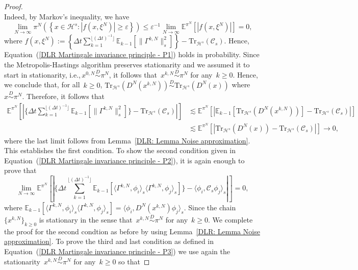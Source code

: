 \begin{proof}
\begin{equation*}
  \end{equation*}
  Indeed, by Markov's inequality, we have
  \begin{equation*}
    \lim_{N \to \infty} \pi^N \left( \left\{ x \in \mathcal{H}^s : \left| f(x, \xi^N)  \right| \geq \varepsilon \right\} \right) \leq \varepsilon^{-1} \lim_{N \to \infty} \mathbb{E}^{\pi^N} \left[ \left| f(x, \xi^N) \right| \right] = 0,
  \end{equation*}
  where $f(x, \xi^N) := \left\{ \Delta t \sum_{k=1}^{\lfloor (\Delta t)^{-1} \rfloor} \mathbb{E}_{k-1}[\| \Gamma^{k,N} \|_s^2]  \right\} - \text{Tr}_{\mathcal{H}^s}(\mathcal{C}_s)$. Hence, Equation~(\ref{DLR Martingale invariance principle - P1}) holds in probability. Since the Metropolis-Hastings algorithm preserves stationarity and we assumed it to start in stationarity, i.e.,\,$x^{0,N} \stackrel{D}{\sim} \pi^N$, it follows that~$x^{k,N}\stackrel{D}{\sim} \pi^N$ for any~$k \geq 0$. Hence, we conclude that, for all~$k \geq 0$, $\text{Tr}_{\mathcal{H}^s} (D^N(x^{k,N})) \stackrel{D}{\sim} \text{Tr}_{\mathcal{H}^s} (D^N(x))$ where $x \stackrel{D}{\sim} \pi^N$. Therefore, it follows that
  \begin{align*}
    \mathbb{E}^{\pi^N} [ | \{ \Delta t \sum_{k=1}^{\lfloor (\Delta t)^{-1} \rfloor} \mathbb{E}_{k-1}[\| \Gamma^{k,N} \|_s^2]  \} - \text{Tr}_{\mathcal{H}^s}(\mathcal{C}_s) | ] & \lesssim \mathbb{E}^{\pi^N} \left[ \left|  \mathbb{E}_{k-1}[\text{Tr}_{\mathcal{H}^s} (D^N(x^{k,N}))] - \text{Tr}_{\mathcal{H}^s}(\mathcal{C}_s) \right| \right] \\
   &  \lesssim \mathbb{E}^{\pi^N} \left[ \left| \text{Tr}_{\mathcal{H}^s} (D^N(x)) - \text{Tr}_{\mathcal{H}^s}(\mathcal{C}_s) \right| \right]  \to 0,
  \end{align*}
  where the last limit follows from Lemma~\ref{DLR: Lemma Noise approximation}. This establishes the first condition. To show the second condition given in Equation~(\ref{DLR Martingale invariance principle  - P2}), it is again enough to prove that
  \begin{equation*}
    \lim_{N \to \infty} \mathbb{E}^{\pi^N} [| \{ \Delta t \sum_{k=1}^{\lfloor (\Delta t)^{-1} \rfloor} \mathbb{E}_{k-1}[\langle \Gamma^{k,N}, \phi_i \rangle_s \langle \Gamma^{k,N}, \phi_j \rangle_s ] \} - \langle \phi_i , \mathcal{C}_s \phi_j \rangle_s |  ] = 0,
  \end{equation*}
  where $\mathbb{E}_{k-1}[\langle \Gamma^{k,N}, \phi_i \rangle_s \langle \Gamma^{k,N}, \phi_j \rangle_s ] = \langle \phi_i, D^N(x^{k,N}) \phi_j \rangle_s$. Since the chain~$\{x^{k,N}\}_{k \geq 0}$ is stationary in the sense that~$x^{k,N}\stackrel{D}{\sim} \pi^N$ for any~$k \geq 0$. We complete the proof for the second condtion as before by using Lemma~\ref{DLR: Lemma Noise approximation}. To prove the third and last condition as defined in Equation~(\ref{DLR Martingale invariance principle  - P3}) we use again the stationarity~$x^{k,N}\stackrel{D}{\sim} \pi^N$ for any~$k \geq 0$ so that

\end{proof}
